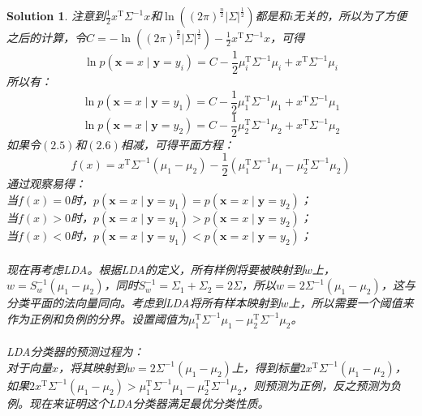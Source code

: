 \documentclass[a4paper,UTF8]{article}
\numberwithin{equation}{section}
\newtheorem*{solution}{Solution}
\begin{document}
\begin{solution}
注意到$\frac{1}{2}x^\mathrm{T}\Sigma^{-1}x$和$ \ln((2\pi)^{\frac{n}{2}}\lvert \Sigma \rvert^{\frac{1}{2}})$都是和$i$无关的，所以为了方便之后的计算，令$C = - \ln((2\pi)^{\frac{n}{2}}\lvert \Sigma \rvert^{\frac{1}{2}}) - \frac{1}{2}x^\mathrm{T}\Sigma^{-1}x$，可得
\begin{equation}
\ln p(\mathbf{x} = x \mid \mathbf{y} = y_i)  = C - \frac{1}{2} \mu_i^\mathrm{T}\Sigma^{-1}\mu_i + x^{\mathrm{T}}\Sigma^{-1}\mu_i 
\end{equation}
所以有：
\begin{equation}
\ln p( \mathbf{x} = x \mid \mathbf{y} = y_1) = C - \frac{1}{2} \mu_1^\mathrm{T}\Sigma^{-1}\mu_1 + x^{\mathrm{T}}\Sigma^{-1}\mu_1 
\end{equation}
\begin{equation}
\ln p(\mathbf{x} = x \mid \mathbf{y} = y_2) = C - \frac{1}{2} \mu_2^\mathrm{T}\Sigma^{-1}\mu_2 + x^{\mathrm{T}}\Sigma^{-1}\mu_2 
\end{equation}
如果令$(2.5)$和$(2.6)$相减，可得平面方程：
\begin{equation}
	f(x) = x^{\mathrm{T}}\Sigma^{-1}(\mu_1 - \mu_2) - \frac{1}{2}(\mu_1^\mathrm{T}\Sigma^{-1}\mu_1 - \mu_2^\mathrm{T}\Sigma^{-1}\mu_2)
\end{equation}
通过观察易得：\\
当$f(x) = 0$时，$p( \mathbf{x} = x \mid \mathbf{y} = y_1) = p( \mathbf{x} = x \mid \mathbf{y} = y_2)$；\\
当$f(x) > 0$时，$p( \mathbf{x} = x \mid \mathbf{y} = y_1) > p( \mathbf{x} = x \mid \mathbf{y} = y_2)$；\\
当$f(x) < 0$时，$p( \mathbf{x} = x \mid \mathbf{y} = y_1) < p( \mathbf{x} = x \mid \mathbf{y} = y_2)$；\\\\
现在再考虑LDA。根据LDA的定义，所有样例将要被映射到$w$上，$w = S^{-1}_w(\mu_1 - \mu_2)$，同时$S^{-1}_w = \Sigma_1 + \Sigma_2 = 2\Sigma$，所以$w = 2\Sigma^{-1}(\mu_1 - \mu_2)$，这与分类平面的法向量同向。考虑到LDA将所有样本映射到$w$上，所以需要一个阈值来作为正例和负例的分界。设置阈值为$\mu_1^\mathrm{T}\Sigma^{-1}\mu_1 - \mu_2^\mathrm{T}\Sigma^{-1}\mu_2$。\\\\
LDA分类器的预测过程为：\\
对于向量$x$，将其映射到$w = 2\Sigma^{-1}(\mu_1 - \mu_2)$上，得到标量$2x^{\mathrm{T}}\Sigma^{-1}(\mu_1 - \mu_2)$，如果$2x^{\mathrm{T}}\Sigma^{-1}(\mu_1 - \mu_2) > \mu_1^\mathrm{T}\Sigma^{-1}\mu_1 - \mu_2^\mathrm{T}\Sigma^{-1}\mu_2$，则预测为正例，反之预测为负例。现在来证明这个LDA分类器满足最优分类性质。\\\\

\end{solution}
\end{document}
